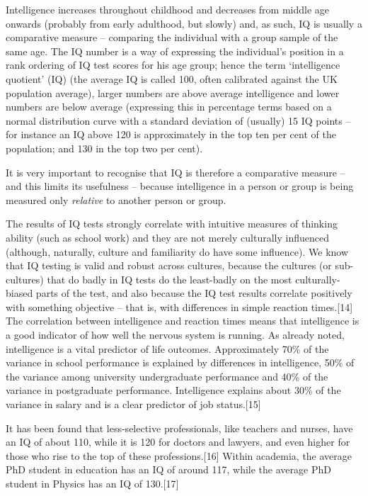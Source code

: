 \documentclass[
]{book}
\begin{document}
Intelligence increases throughout childhood and decreases from middle age onwards (probably from early adulthood, but slowly) and, as such, IQ is usually a comparative measure -- comparing the individual with a group sample of the same age. The IQ number is a way of expressing the individual's position in a rank ordering of IQ test scores for his age group; hence the term `intelligence quotient' (IQ) (the average IQ is called 100, often calibrated against the UK population average), larger numbers are above average intelligence and lower numbers are below average (expressing this in percentage terms based on a normal distribution curve with a standard deviation of (usually) 15 IQ points -- for instance an IQ above 120 is approximately in the top ten per cent of the population; and 130 in the top two per cent).

It is very important to recognise that IQ is therefore a comparative measure -- and this limits its usefulness -- because intelligence in a person or group is being measured only \emph{relative} to another person or group.

The results of IQ tests strongly correlate with intuitive measures of thinking ability (such as school work) and they are not merely culturally influenced (although, naturally, culture and familiarity do have some influence). We know that IQ testing is valid and robust across cultures, because the cultures (or sub-cultures) that do badly in IQ tests do the least-badly on the most culturally-biased parts of the test, and also because the IQ test results correlate positively with something objective -- that is, with differences in simple reaction times.{[}14{]} The correlation between intelligence and reaction times means that intelligence is a good indicator of how well the nervous system is running.
As already noted, intelligence is a vital predictor of life outcomes. Approximately 70\% of the variance in school performance is explained by differences in intelligence, 50\% of the variance among university undergraduate performance and 40\% of the variance in postgraduate performance. Intelligence explains about 30\% of the variance in salary and is a clear predictor of job status.{[}15{]}

It has been found that less-selective professionals, like teachers and nurses, have an IQ of about 110, while it is 120 for doctors and lawyers, and even higher for those who rise to the top of these professions.{[}16{]} Within academia, the average PhD student in education has an IQ of around 117, while the average PhD student in Physics has an IQ of 130.{[}17{]}
\end{document}

